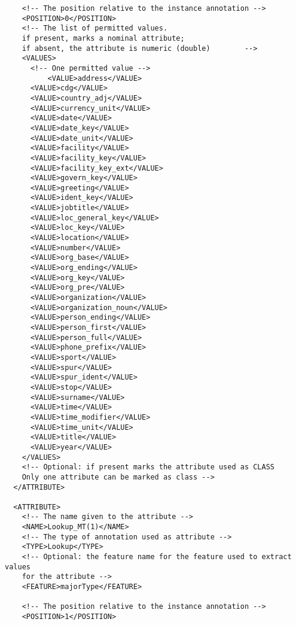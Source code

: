 \begin{verbatim}
    <!-- The position relative to the instance annotation -->
    <POSITION>0</POSITION>
    <!-- The list of permitted values.
    if present, marks a nominal attribute;
    if absent, the attribute is numeric (double)        -->
    <VALUES>
      <!-- One permitted value -->
          <VALUE>address</VALUE>
      <VALUE>cdg</VALUE>
      <VALUE>country_adj</VALUE>
      <VALUE>currency_unit</VALUE>
      <VALUE>date</VALUE>
      <VALUE>date_key</VALUE>
      <VALUE>date_unit</VALUE>
      <VALUE>facility</VALUE>
      <VALUE>facility_key</VALUE>
      <VALUE>facility_key_ext</VALUE>
      <VALUE>govern_key</VALUE>
      <VALUE>greeting</VALUE>
      <VALUE>ident_key</VALUE>
      <VALUE>jobtitle</VALUE>
      <VALUE>loc_general_key</VALUE>
      <VALUE>loc_key</VALUE>
      <VALUE>location</VALUE>
      <VALUE>number</VALUE>
      <VALUE>org_base</VALUE>
      <VALUE>org_ending</VALUE>
      <VALUE>org_key</VALUE>
      <VALUE>org_pre</VALUE>
      <VALUE>organization</VALUE>
      <VALUE>organization_noun</VALUE>
      <VALUE>person_ending</VALUE>
      <VALUE>person_first</VALUE>
      <VALUE>person_full</VALUE>
      <VALUE>phone_prefix</VALUE>
      <VALUE>sport</VALUE>
      <VALUE>spur</VALUE>
      <VALUE>spur_ident</VALUE>
      <VALUE>stop</VALUE>
      <VALUE>surname</VALUE>
      <VALUE>time</VALUE>
      <VALUE>time_modifier</VALUE>
      <VALUE>time_unit</VALUE>
      <VALUE>title</VALUE>
      <VALUE>year</VALUE>
    </VALUES>
    <!-- Optional: if present marks the attribute used as CLASS
    Only one attribute can be marked as class -->
  </ATTRIBUTE>

  <ATTRIBUTE>
    <!-- The name given to the attribute -->
    <NAME>Lookup_MT(1)</NAME>
    <!-- The type of annotation used as attribute -->
    <TYPE>Lookup</TYPE>
    <!-- Optional: the feature name for the feature used to extract values
    for the attribute -->
    <FEATURE>majorType</FEATURE>

    <!-- The position relative to the instance annotation -->
    <POSITION>1</POSITION>


\end{verbatim}
